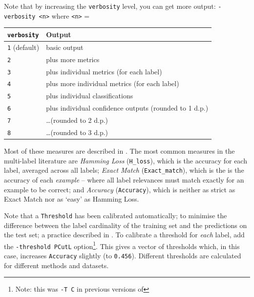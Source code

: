 \documentclass[11pt]{article}
\newcommand{\MEKA}{Meka}
\begin{document}
Note that by increasing the \texttt{verbosity} level, you can get more output: \texttt{-verbosity <n>} where \texttt{<n>} = 
\begin{center}
\begin{tabular}{ll}
	\hline
	\texttt{verbosity}       & Output \\
	\hline
	\texttt{1} (default) & basic output \\
	 \texttt{2}           & plus more metrics \\
	  \texttt{3}           & plus individual metrics (for each label) \\
	   \texttt{4}           & plus more individual metrics (for each label) \\
		\texttt{5}           & plus individual classifications \\
	  \texttt{6}           & plus individual confidence outputs (rounded to 1 d.p.) \\
	   \texttt{7}           & \ldots (rounded to 2 d.p.) \\
		\texttt{8}           & \ldots (rounded to 3 d.p.) \\
	\hline
\end{tabular}
\end{center}

Most of these measures are described in \cite{Thesis,ECC2,MMD}. The most common measures in the multi-label literature are \textit{Hamming Loss} (\texttt{H\_loss}), which is the accuracy for each label, averaged across all labels; \textit{Exact Match} (\texttt{Exact\_match}), which is the is the accuracy of each \emph{example} -- where all label relevances must match exactly for an example to be correct; and \textit{Accuracy} (\texttt{Accuracy}), which is neither as strict as Exact Match nor as `easy' as Hamming Loss.


Note that a \texttt{Threshold} has been calibrated automatically; to minimise the difference between the label cardinality of the training set and the predictions on the test set; a practice described in \cite{ECC2}. To calibrate a threshold for \emph{each} label, add the \texttt{-threshold PCutL} option\footnote{Note: this was \texttt{-T C} in previous versions of \framework{\MEKA}}. This gives a vector of thresholds which, in this case, increases \texttt{Accuracy} slightly (to \texttt{0.456}). Different thresholds are calculated for different methods and datasets.
\end{document}
